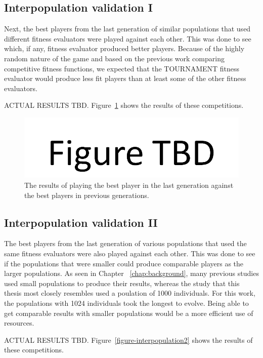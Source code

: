 \subsection{Interpopulation validation I}

Next, the best players from the last generation of similar populations that used
different fitness evaluators were played against each other. This was done to
see which, if any, fitness evaluator produced better players. Because of the
highly random nature of the game and based on the previous work comparing
competitive fitness functions, we expected that the TOURNAMENT fitness evaluator
would produce less fit players than at least some of the other fitness
evaluators.

ACTUAL RESULTS TBD. Figure~\ref{figure-interpopulation1} shows the results of
these competitions.

\begin{figure}[htp]
\centerline{\includegraphics[width=0.75\columnwidth]{Figures/figureTBD.png}}
\caption[Validation - Comparing Fitness Evaluators]{The results of playing the
best player in the last generation against the best players in previous
generations.}
\label{figure-interpopulation1}
\end{figure}

\subsection{Interpopulation validation II}

The best players from the last generation of various populations that used
the same fitness evaluators were also played against each other. This was done
to see if the populations that were smaller could produce comparable
players as the larger populations. As seen in Chapter ~\ref{chap:background},
many previous studies used small populations to produce their results, whereas
the study that this thesis most closely resembles used a poulation of 1000
individuals. For this work, the populations with 1024 individuals took the
longest to evolve. Being able to get comparable results with smaller populations
would be a more efficient use of resources.

ACTUAL RESULTS TBD. Figure~\ref{figure-interpopulation2} shows the results of
these competitions.

